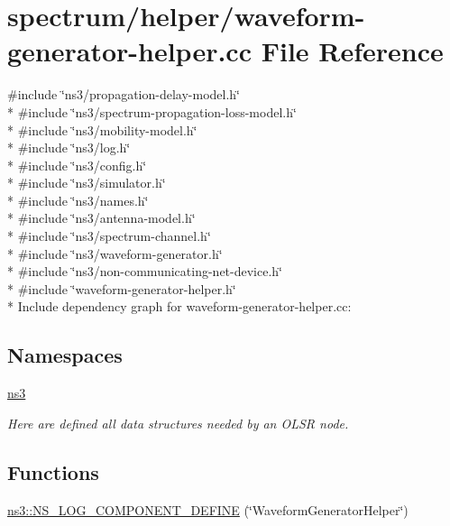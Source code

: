 \hypertarget{waveform-generator-helper_8cc}{}\section{spectrum/helper/waveform-\/generator-\/helper.cc File Reference}
\label{waveform-generator-helper_8cc}
{\ttfamily \#include \char`\"{}ns3/propagation-\/delay-\/model.\+h\char`\"{}}\\*
{\ttfamily \#include \char`\"{}ns3/spectrum-\/propagation-\/loss-\/model.\+h\char`\"{}}\\*
{\ttfamily \#include \char`\"{}ns3/mobility-\/model.\+h\char`\"{}}\\*
{\ttfamily \#include \char`\"{}ns3/log.\+h\char`\"{}}\\*
{\ttfamily \#include \char`\"{}ns3/config.\+h\char`\"{}}\\*
{\ttfamily \#include \char`\"{}ns3/simulator.\+h\char`\"{}}\\*
{\ttfamily \#include \char`\"{}ns3/names.\+h\char`\"{}}\\*
{\ttfamily \#include \char`\"{}ns3/antenna-\/model.\+h\char`\"{}}\\*
{\ttfamily \#include \char`\"{}ns3/spectrum-\/channel.\+h\char`\"{}}\\*
{\ttfamily \#include \char`\"{}ns3/waveform-\/generator.\+h\char`\"{}}\\*
{\ttfamily \#include \char`\"{}ns3/non-\/communicating-\/net-\/device.\+h\char`\"{}}\\*
{\ttfamily \#include \char`\"{}waveform-\/generator-\/helper.\+h\char`\"{}}\\*
Include dependency graph for waveform-\/generator-\/helper.cc\+:
\subsection*{Namespaces}
\begin{DoxyCompactItemize}
\item 
 \hyperlink{namespacens3}{ns3}
\begin{DoxyCompactList}\small\item\em Here are defined all data structures needed by an O\+L\+SR node. \end{DoxyCompactList}\end{DoxyCompactItemize}
\subsection*{Functions}
\begin{DoxyCompactItemize}
\item 
\hyperlink{namespacens3_a72ca70352122cd50f3422a1ffaa395d0}{ns3\+::\+N\+S\+\_\+\+L\+O\+G\+\_\+\+C\+O\+M\+P\+O\+N\+E\+N\+T\+\_\+\+D\+E\+F\+I\+NE} (\char`\"{}Waveform\+Generator\+Helper\char`\"{})
\end{DoxyCompactItemize}

